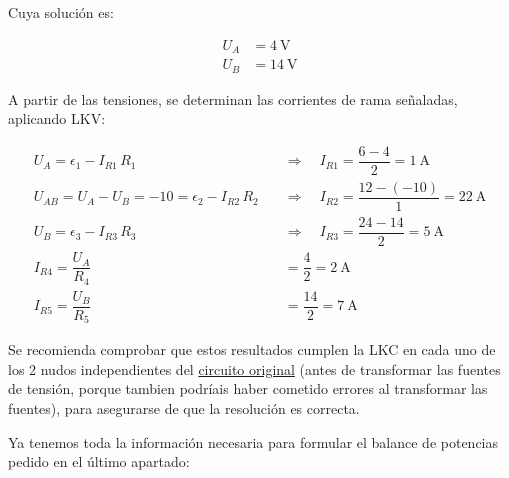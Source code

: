 \begin{example}
          \vspace{5mm} Cuya solución es:

          \vspace{-5mm}
          \begin{align*}
            U_A&=\qty{4}{\volt}\\
            U_B&=\qty{14}{\volt}
          \end{align*}

          A partir de las tensiones, se determinan las corrientes de
          rama señaladas, aplicando LKV:


          \vspace{-5mm}
          \begin{align*}
            U_A=\epsilon_1-I_{R1}\,R_1 \quad &\Rightarrow \quad {I_{R1}=\dfrac{6-4}{2}= \qty{1}{\ampere}}\\
            U_{AB}=U_A-U_B=-10=\epsilon_2 - I_{R2}\, R_2 \quad &\Rightarrow \quad I_{R2} = \dfrac{12-(-10)}{1}= \qty{22}{\ampere}\\
            U_B=\epsilon_3-I_{R3}\,R_3 \quad &\Rightarrow \quad I_{R3}=\dfrac{24-14}{2}= \qty{5}{\ampere}\\
            I_{R4}=\dfrac{U_A}{R_4}&=\dfrac{4}{2}= \qty{2}{\ampere}\\
            I_{R5}=\dfrac{U_B}{R_5}&=\dfrac{14}{2}= \qty{7}{\ampere}
          \end{align*}

          \vspace{2mm} Se recomienda comprobar que estos resultados
          cumplen la LKC en cada uno de los 2 nudos independientes del
          \underline{circuito original} (antes de transformar las
          fuentes de tensión, porque tambien podríais haber cometido
          errores al transformar las fuentes), para asegurarse de que
          la resolución es correcta.

          \vspace{4mm} Ya tenemos toda la información necesaria para
          formular el balance de potencias pedido en el último
          apartado:


\end{example}

